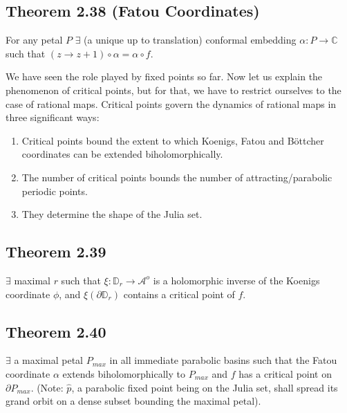 \documentclass[11pt,a4paper]{article}
\begin{document}

        \subsection*{Theorem 2.38 (Fatou Coordinates)} For any petal $P$ $\exists$ (a unique up to translation) conformal embedding $\alpha: P \rightarrow \mathbb{C}$ such that $(z \rightarrow z+1) \circ \alpha = \alpha \circ f$.



        We have seen the role played by fixed points so far. Now let us explain the phenomenon of critical points, but for that, we have to restrict ourselves to the case of rational maps. Critical points govern the dynamics of rational maps in three significant ways:

        \begin{enumerate}
            \item Critical points bound the extent to which Koenigs, Fatou and B\"ottcher coordinates can be extended biholomorphically.
            \item The number of critical points bounds the number of attracting/parabolic periodic points.
            \item They determine the shape of the Julia set.
        \end{enumerate}


        \subsection*{Theorem 2.39}
        $\exists$ maximal $r$ such that $\xi: \mathbb{D}_r \rightarrow \mathcal{A}^o$ is a holomorphic inverse of the Koenigs coordinate $\phi$, and $\xi(\partial \mathbb{D}_r)$ contains a critical point of $f$.


        \subsection*{Theorem 2.40}
        $\exists$ a maximal petal $P_{max}$ in all immediate parabolic basins such that the Fatou coordinate $\alpha$ extends biholomorphically to $P_{max}$ and $f$ has a critical point on $\partial P_{max}$. (Note: $\hat{p}$, a parabolic fixed point being on the Julia set, shall spread its grand orbit on a dense subset bounding the maximal petal).
\end{document}
